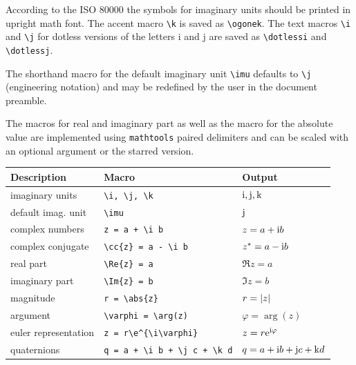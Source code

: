 \documentclass[DIV=13]{scrartcl}
\begin{document}
According to the ISO \num{80000} the symbols for imaginary units should be
printed in upright math font.
The accent macro \verb|\k| is saved as \verb|\ogonek|. The text macros
\verb|\i| and \verb|\j| for dotless versions of the letters i and j are saved
as \verb|\dotlessi| and \verb|\dotlessj|.

The shorthand macro for the default imaginary unit \verb|\imu| defaults to
\verb|\j| (engineering notation) and may be redefined by the user in the
document preamble.

The macros for real and imaginary part as well as the macro for the absolute
value are implemented using \texttt{mathtools} paired delimiters and can be
scaled with an optional argument or the starred version.
\begin{center}
  \begin{tabular}{lll}
    \toprule
    \textbf{Description} & \textbf{Macro}             & \textbf{Output}     \\
    \midrule
    imaginary units      & \verb|\i, \j, \k|          & $\mathrm{i}, \mathrm{j}, \mathrm{k}$        \\
    default imag. unit   & \verb|\imu|                & $\mathrm{j}$              \\
    complex numbers      & \verb|z = a + \i b|        & $z = a + \mathrm{i} b$      \\
    complex conjugate    & \verb|\cc{z} = a - \i b|   & ${z^\ast} = a - \mathrm{i} b$ \\
    real part            & \verb|\Re{z} = a|          & $\Re{z} = a$        \\
    imaginary part       & \verb|\Im{z} = b|          & $\Im{z} = b$        \\
    magnitude            & \verb|r = \abs{z}|         & $r = \lvert z\rvert$       \\
    argument             & \verb|\varphi = \arg(z)|   & $\varphi = \arg(z)$ \\
    euler representation & \verb|z = r\e^{\i\varphi}|
                         & $z = r\mathrm{e}^{\mathrm{i}\varphi}$                            \\
    \midrule
    quaternions          & \verb|q = a + \i b + \j c + \k d|
                         & $q = a + \mathrm{i} b + \mathrm{j} c + \mathrm{k} d$                     \\
    \bottomrule
  \end{tabular}
\end{center}
\end{document}
